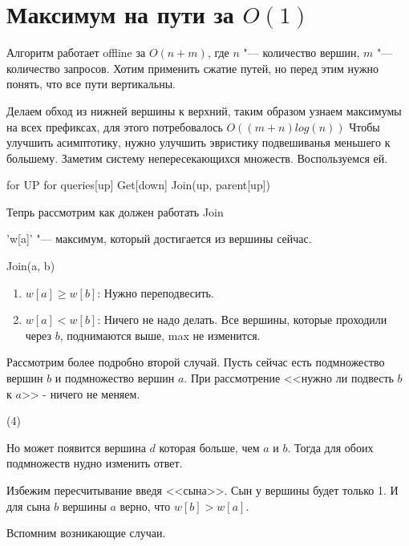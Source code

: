 \chapter{\texorpdfstring{Максимум на пути за $O(1)$}{Максимум на пути за O(1)}}

Алгоритм работает offline за $O(n+m)$, где $n$ "--- количество вершин, $m$ "--- количество запросов.
Хотим применить сжатие путей, но перед этим нужно понять, что все пути вертикальны.


Делаем обход из нижней вершины к верхний, таким образом узнаем максимумы на всех префиксах, для этого потребовалось $O((m + n)log(n))$
Чтобы улучшить асимптотику, нужно улучшить эвристику подвешиванья меньшего к большему.
Заметим систему непересекающихся множеств. Воспользуемся ей.


\begin{cppcode}
for UP
	for queries[up]
		Get[down]
Join(up, parent[up])
\end{cppcode}

Тепрь рассмотрим как должен работать Join

\cpp'w[a]' "--- максимум, который достигается из вершины сейчас.


Join(a, b)
\begin{enumerate}
\item
	$w[a] \ge w[b]$:
	Нужно переподвесить.

\item
	$w[a] < w[b]$:
	Ничего не надо делать.
	Все вершины, которые проходили через $b$, поднимаются выше, max не изменится.
\end{enumerate}

Рассмотрим более подробно второй случай.
Пусть сейчас есть подмножество вершин $b$ и подмножество вершин $a$.
При рассмотрение <<нужно ли подвесть $b$ к $a$>> - ничего не меняем.

(4)

Но может появится вершина $d$ которая больше, чем $a$ и $b$. Тогда для обоих подмножеств нудно изменить ответ.


Избежим пересчитывание введя <<сына>>. Сын у вершины будет только 1. И для сына $b$ вершины $a$ верно, что $w[b] > w[a]$.

Вспомним возникающие случаи.

